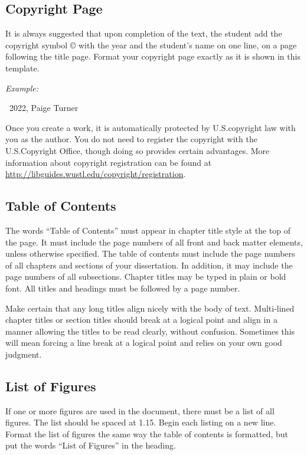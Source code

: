 \subsection{Copyright Page}

It is always suggested that upon completion of the text, the student add the copyright symbol © with the year and the student's name on one line, on a page following the title page.
Format your copyright page exactly as it is shown in this template.

\vspace{\onelineskip}
\noindent
\textit{Example:}

\centerline{\textcopyright\ 2022, Paige Turner}
\vspace{\onelineskip}

Once you create a work, it is automatically protected by U.S.\@ copyright law with you as the author.
You do not need to register the copyright with the U.S.\@ Copyright Office, though doing so provides certain advantages.
More information about copyright registration can be found at \href{http://libguides.wustl.edu/copyright/registration}{http://libguides.wustl.edu/copyright/registration}.

\subsection{Table of Contents}

The words ``Table of Contents'' must appear in chapter title style at the top of the page.
It must include the page numbers of all front and back matter elements, unless otherwise specified.
The table of contents must include the page numbers of all chapters and sections of your dissertation.
In addition, it may include the page numbers of all subsections.
Chapter titles may be typed in plain or bold font.
All titles and headings must be followed by a page number.

Make certain that any long titles align nicely with the body of text.
Multi-lined chapter titles or section titles should break at a logical point and align in a manner allowing the titles to be read clearly, without confusion.
Sometimes this will mean forcing a line break at a logical point and relies on your own good judgment.

\subsection{List of Figures}

If one or more figures are used in the document, there must be a list of all figures.
The list should be spaced at 1.15.
Begin each listing on a new line.
Format the list of figures the same way the table of contents is formatted, but put the words ``List of Figures'' in the heading.

